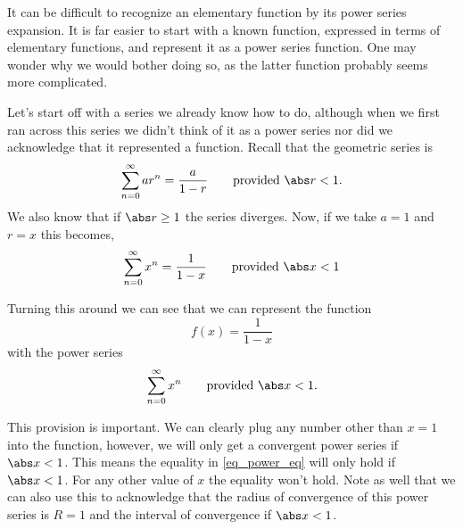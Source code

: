It can be difficult to recognize an elementary function by its power series expansion. It is far easier to start with a known function, expressed in terms of elementary functions, and represent it as a power series function. One may wonder why we would bother doing so, as the latter function probably seems more complicated.


Let's start off with a series we already know how to do, although when we first ran across this series we didn't think of it as a power series nor did we acknowledge that it represented a function. Recall that the geometric series is
$$\sum_{n=0}^\infty ar^n = \frac a{1-r} \qquad \text{provided }\abs r<1.$$
We also know that if $\abs r\geq 1$ the series diverges. Now, if we take $a=1$ and $r=x$ this becomes,
\begin{equation}\label{eq_power_eq}
\sum_{n=0}^\infty x^n=\frac1{1-x}\qquad\text{provided }\abs x<1
\end{equation}

Turning this around we can see that we can represent the function
\begin{equation}\label{eq_power_func}
f(x) = \frac1{1-x}
\end{equation}
with the power series
\begin{equation}\label{eq_power_series}
\sum_{n=0}^{\infty}x^n \qquad \text{provided }\abs x<1.
\end{equation}

This provision is important.  We can clearly plug any number other than $x=1$ into the function, however, we will only get a convergent power series if $\abs x<1$.  This means the equality in \eqref{eq_power_eq} will only hold if $\abs x<1$.  For any other value of $x$ the equality won't hold.  Note as well that we can also use this to acknowledge that the radius of convergence of this power series is $R=1$ and the interval of convergence if $\abs x<1$.

